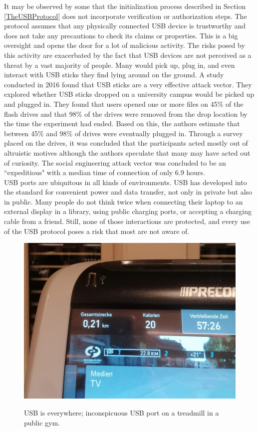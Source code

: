 It may be observed by some that the initialization process described in Section \ref{TheUSBProtocol} does not incorporate verification or authorization steps. The protocol assumes that any physically connected USB device is trustworthy and does not take any precautions to check its claims or properties. This is a big oversight and opens the door for a lot of malicious activity. 
The risks posed by this activity are exacerbated by the fact that USB devices are not perceived as a threat by a vast majority of people. Many would pick up, plug in, and even interact with USB sticks they find lying around on the ground. A study \cite{tischerUsersReallyPlug2016} conducted in 2016 found that USB sticks are a very effective attack vector. They explored whether USB sticks dropped on a university campus would be picked up and plugged in. They found that users opened one or more files on 45\% of the flash drives and that 98\% of the drives were removed from the drop location by the time the experiment had ended. Based on this, the authors estimate that between 45\% and 98\% of drives were eventually plugged in. Through a survey placed on the drives, it was concluded that the participants acted mostly out of altruistic motives although the authors speculate that many may have acted out of curiosity. The social engineering attack vector was concluded to be an ``expeditious" with a median time of connection of only 6.9 hours. \\
USB ports are ubiquitous in all kinds of environments. USB has developed into the standard for convenient power and data transfer, not only in private but also in public.  Many people do not think twice when connecting their laptop to an external display in a library, using public charging ports, or accepting a charging cable from a friend. Still, none of those interactions are protected, and every use of the USB protocol poses a risk that most are not aware of.

\begin{figure}[H]
    \centering
    \includegraphics[width=0.6\linewidth]{visuals/USB_treadmill.jpeg}
    \caption{USB is everywhere; inconspicuous USB port on a treadmill in a public gym.}
    \label{fig:USB_treadmill}
    \cite{}
\end{figure}

